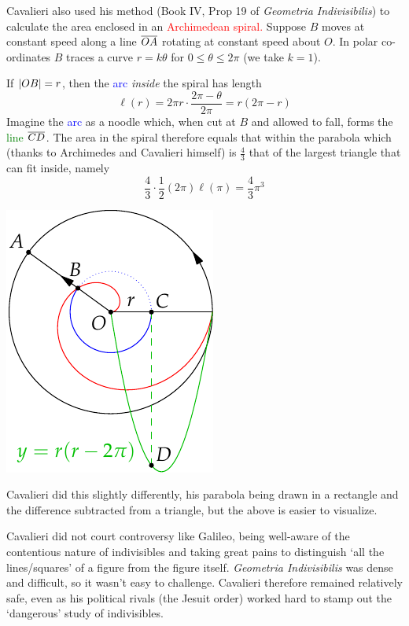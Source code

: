 \label{pg:cavspiral}
Cavalieri also used his method (Book IV, Prop 19 of \emph{Geometria Indivisibilis}) to calculate the area enclosed in an \textcolor{red}{Archimedean spiral.} Suppose $B$ moves at constant speed along a line $\overline{OA}$ rotating at constant speed about $O$. In polar co-ordinates $B$ traces a curve $r=k\theta$ for $0\le\theta\le 2\pi$ (we take $k=1$).\par
\begin{minipage}[t]{0.73\textwidth}\vspace{-5pt}
	If $\left| OB\right|=r$, then the \textcolor{blue}{arc} \emph{inside} the spiral has length
	\[
		\ell(r)=2\pi r\cdot\frac{2\pi-\theta}{2\pi}=r(2\pi-r)
	\]
	Imagine the \textcolor{blue}{arc} as a noodle which, when cut at $B$ and allowed to fall, forms the \textcolor{Green}{line} $\overline{CD}$. The area in the spiral therefore equals that within the parabola which (thanks to Archimedes and Cavalieri himself) is  $\frac 43$ that of the largest triangle that can fit inside, namely
	\[
		\frac 43\cdot \frac 12(2\pi)\ell(\pi)=\frac 43\pi^3
	\]
\end{minipage}
\hfill
\begin{minipage}[t]{0.25\textwidth}\vspace{-5pt}
	\flushright\includegraphics[scale=0.9]{cavalieri1}
\end{minipage}\medbreak

Cavalieri did this slightly differently, his parabola being drawn in a rectangle and the difference subtracted from a triangle, but the above is easier to visualize.\medbreak %

Cavalieri did not court controversy like Galileo, being well-aware of the contentious nature of indivisibles and taking great pains to distinguish `all the lines/squares' of a figure from the figure itself. \emph{Geometria Indivisibilis} was dense and difficult, so it wasn't easy to challenge. Cavalieri therefore remained relatively safe, even as his political rivals (the Jesuit order) worked hard to stamp out the `dangerous' study of indivisibles.

